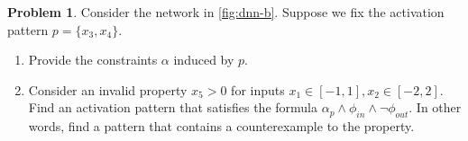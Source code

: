 \documentclass[oneside,11pt,dvipsnames]{book}
\numberwithin{equation}{section}
\theoremstyle{definition}
\newtheorem{problem}{Problem}[section]
\theoremstyle{remark}
\begin{document}
\begin{problem}\label{problem:nnv-pattern}
Consider the network in \autoref{fig:dnn-b}. Suppose we fix the activation pattern $p=\{x_3, x_4\}$.

\begin{enumerate}
  \item Provide the constraints $\alpha$ induced by $p$.
  \item Consider an invalid property $x_5 > 0$ for inputs $x_1 \in [-1,1], x_2 \in [-2,2]$. Find an activation pattern that satisfies the formula $\alpha_p \land \phi_{in} \land \neg \phi_{out}$. In other words, find a pattern that contains a counterexample to the property.
\end{enumerate}

\end{problem}




\end{document}

